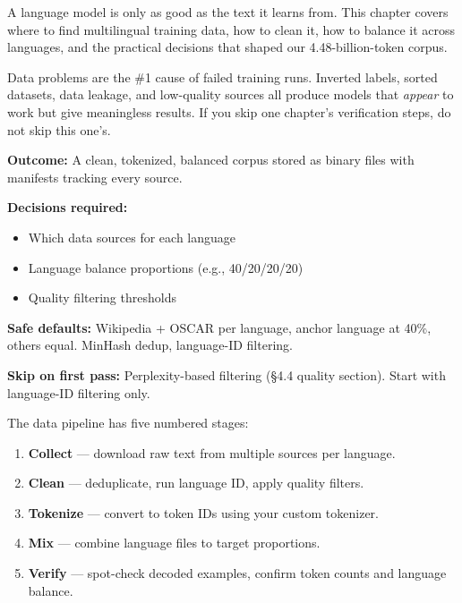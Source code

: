 \documentclass[11pt,a4paper]{article}
\begin{document}
A language model is only as good as the text it learns from. This chapter covers where to find multilingual training data, how to clean it, how to balance it across languages, and the practical decisions that shaped our 4.48-billion-token corpus.

\begin{warning}[title={Most Beginner Failures Start Here}]
Data problems are the \#1 cause of failed training runs. Inverted labels, sorted datasets, data leakage, and low-quality sources all produce models that \emph{appear} to work but give meaningless results. If you skip one chapter's verification steps, do not skip this one's.
\end{warning}

\begin{buildnow}
\textbf{Outcome:} A clean, tokenized, balanced corpus stored as binary files with manifests tracking every source.

\textbf{Decisions required:}
\begin{itemize}[nosep]
  \item Which data sources for each language
  \item Language balance proportions (e.g., 40/20/20/20)
  \item Quality filtering thresholds
\end{itemize}

\textbf{Safe defaults:} Wikipedia + OSCAR per language, anchor language at 40\%, others equal. MinHash dedup, language-ID filtering.

\textbf{Skip on first pass:} Perplexity-based filtering (\S4.4 quality section). Start with language-ID filtering only.
\end{buildnow}

The data pipeline has five numbered stages:
\begin{enumerate}[nosep]
  \item \textbf{Collect} --- download raw text from multiple sources per language.
  \item \textbf{Clean} --- deduplicate, run language ID, apply quality filters.
  \item \textbf{Tokenize} --- convert to token IDs using your custom tokenizer.
  \item \textbf{Mix} --- combine language files to target proportions.
  \item \textbf{Verify} --- spot-check decoded examples, confirm token counts and language balance.
\end{enumerate}
\end{document}

